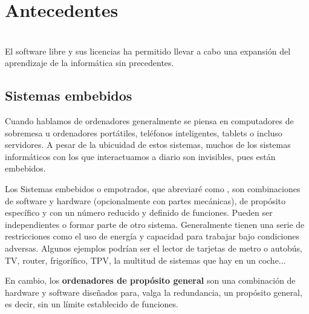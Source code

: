 \chapter{Antecedentes}

\noindent{}\\

El software libre y sus licencias \cite{gplv3} ha permitido llevar a cabo una expansión del aprendizaje de la informática sin precedentes.

\section{Sistemas embebidos}
Cuando hablamos de ordenadores generalmente se piensa en computadores de sobremesa u  ordenadores portátiles, teléfonos inteligentes, tablets o incluso servidores. A pesar de la ubicuidad de estos sistemas, muchos de los sistemas informáticos con los que interactuamos a diario son invisibles, pues están embebidos.

    Los Sistemas embebidos o empotrados, que abreviaré como , son combinaciones de software y hardware (opcionalmente con partes mecánicas), de propósito específico y con un número reducido y definido de funciones. Pueden ser independientes o formar parte de otro sistema. Generalmente tienen una serie de restricciones como el uso de energía y capacidad para trabajar bajo condiciones adversas. Algunos ejemplos podrían ser el lector de tarjetas de metro o autobús, TV, router, frigorífico, TPV, la multitud de sistemas que hay en un coche... \cite{es_glossary} \cite{marwedel}

En cambio, los \textbf{ordenadores de propósito general} son una combinación de hardware y software diseñados para, valga la redundancia, un propósito general, es decir, sin un límite establecido de funciones. \cite{es_glossary}\\

